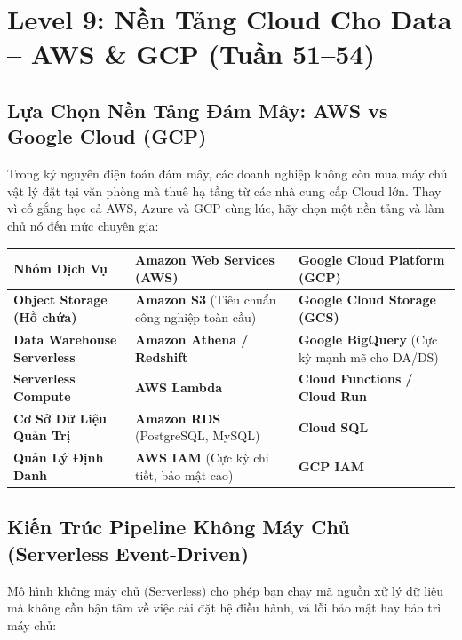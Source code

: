 \chapter{Level 9: Nền Tảng Cloud Cho Data -- AWS \& GCP (Tuần 51--54)}

\section{Lựa Chọn Nền Tảng Đám Mây: AWS vs Google Cloud (GCP)}

Trong kỷ nguyên điện toán đám mây, các doanh nghiệp không còn mua máy chủ vật lý đặt tại văn phòng mà thuê hạ tầng từ các nhà cung cấp Cloud lớn. Thay vì cố gắng học cả AWS, Azure và GCP cùng lúc, hãy chọn một nền tảng và làm chủ nó đến mức chuyên gia:

\begin{center}
\begin{tabular}{|l|p{5cm}|p{5cm}|}
\hline
\textbf{Nhóm Dịch Vụ} & \textbf{Amazon Web Services (AWS)} & \textbf{Google Cloud Platform (GCP)} \\
\hline
\textbf{Object Storage (Hồ chứa)} & \textbf{Amazon S3} (Tiêu chuẩn công nghiệp toàn cầu) & \textbf{Google Cloud Storage (GCS)} \\
\hline
\textbf{Data Warehouse Serverless} & \textbf{Amazon Athena / Redshift} & \textbf{Google BigQuery} (Cực kỳ mạnh mẽ cho DA/DS) \\
\hline
\textbf{Serverless Compute} & \textbf{AWS Lambda} & \textbf{Cloud Functions / Cloud Run} \\
\hline
\textbf{Cơ Sở Dữ Liệu Quản Trị} & \textbf{Amazon RDS} (PostgreSQL, MySQL) & \textbf{Cloud SQL} \\
\hline
\textbf{Quản Lý Định Danh} & \textbf{AWS IAM} (Cực kỳ chi tiết, bảo mật cao) & \textbf{GCP IAM} \\
\hline
\end{tabular}
\end{center}

\section{Kiến Trúc Pipeline Không Máy Chủ (Serverless Event-Driven)}

Mô hình không máy chủ (Serverless) cho phép bạn chạy mã nguồn xử lý dữ liệu mà không cần bận tâm về việc cài đặt hệ điều hành, vá lỗi bảo mật hay bảo trì máy chủ:

